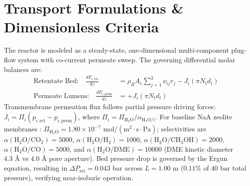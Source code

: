 \documentclass[12pt,a4paper]{article}
\begin{document}
\section{Transport Formulations \& Dimensionless Criteria}
The reactor is modeled as a steady-state, one-dimensional multi-component plug-flow system with co-current permeate sweep. The governing differential molar balances are:
\begin{align}
    \text{Retentate Bed:} \quad \frac{d F_{i,\text{ret}}}{d z} &= \rho_B A_c \sum_{j=1}^{3} \nu_{ij} r_j - J_i (\pi N_t d_t) \label{eq:diff_ret} \\
    \text{Permeate Lumens:} \quad \frac{d F_{i,\text{perm}}}{d z} &= + J_i (\pi N_t d_t) \label{eq:diff_perm}
\end{align}
Transmembrane permeation flux follows partial pressure driving forces: $J_i = \Pi_i (p_{i,\text{ret}} - p_{i,\text{perm}})$, where $\Pi_i = \Pi_{\text{H}_2\text{O}} / \alpha_{\text{H}_2\text{O}/i}$. For baseline NaA zeolite membranes \cite{li2020, dong2022}: $\Pi_{\text{H}_2\text{O}} = 1.80 \times 10^{-7}\text{ mol}/(\text{m}^2\cdot\text{s}\cdot\text{Pa})$; selectivities are $\alpha(\text{H}_2\text{O}/\text{CO}_2) = 5000$, $\alpha(\text{H}_2\text{O}/\text{H}_2) = 1000$, $\alpha(\text{H}_2\text{O}/\text{CH}_3\text{OH}) = 2000$, $\alpha(\text{H}_2\text{O}/\text{CO}) = 5000$, and $\alpha(\text{H}_2\text{O}/\text{DME}) = 10000$ (DME kinetic diameter $4.3\text{ \AA}$ vs $4.0\text{ \AA}$ pore aperture). Bed pressure drop is governed by the Ergun equation, resulting in $\Delta P_{\text{ret}} = 0.043\text{ bar}$ across $L = 1.00\text{ m}$ ($0.11\%$ of $40\text{ bar}$ total pressure), verifying near-isobaric operation.
\end{document}
